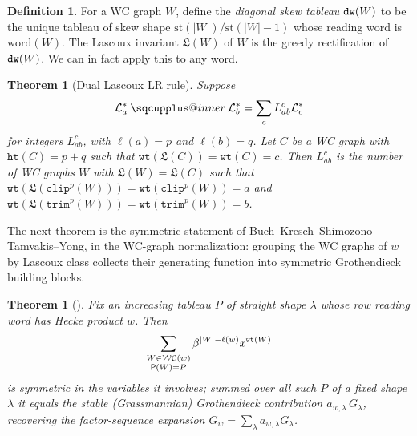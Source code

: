 \documentclass{amsart}
\makeatletter
\newcommand{\sqcupplus@inner}[2]{%
  \vcenter{\hbox{\ooalign{%
    \hfil$\m@th#1\sqcup$\hfil\cr
    \hfil\raisebox{0.15ex}{$\m@th#1\scriptscriptstyle+$}\hfil\cr
  }}}%
}
\newcommand{\sqcupplus}{\mathbin{\mathpalette\sqcupplus@inner\relax}}
\newtheorem{theorem}[lemma]{Theorem}
\theoremstyle{definition}
\newtheorem{definition}[lemma]{Definition}
\theoremstyle{remark}
\numberwithin{equation}{subsection}
\newcommand{\wtt}{\mathtt{wt}}
\newcommand{\trm}{\mathtt{trim}}
\newcommand{\hr}{\mathtt{ht}}
\newcommand{\clp}{\mathtt{clip}}
\newcommand{\WC}{\mathcal{WC}}
\makeatother
\begin{document}
\newcommand{\hi}{\mathfrak{L}}
\begin{definition}
For a WC graph $W$, define the \emph{diagonal skew tableau} $\mathtt{dw}(W)$ to be the unique tableau of skew shape $\mathrm{st}(|W|)/\mathrm{st}(|W|-1)$ whose reading word is $\mathrm{word}(W)$. The Lascoux invariant $\hi(W)$ of $W$ is the greedy rectification of $\mathtt{dw}(W)$. We can in fact apply this to any word.
\end{definition}


\begin{theorem}[Dual Lascoux LR rule]
Suppose
$$\mathcal{L}_a^*\sqcupplus \mathcal{L}_b^* = \sum_c L_{ab}^c\mathcal{L}_c^*$$
for integers $L_{ab}^c$, with $\ell(a)=p$ and $\ell(b)=q$. Let $C$ be a WC graph with $\hr(C)=p+q$ such that $\wtt(\hi(C)) = \wtt(C) = c$. Then $L_{ab}^c$ is the number of WC graphs $W$ with $\hi(W) = \hi(C)$ such that $\wtt(\hi(\clp^p(W))) = \wtt(\clp^p(W)) = a$ and $\wtt(\hi(\trm^p(W))) = \wtt(\trm^p(W)) = b$.
\end{theorem}


The next theorem is the symmetric statement of
Buch--Kresch--Shimozono--Tamvakis--Yong, in the WC-graph normalization: grouping
the WC graphs of $w$ by Lascoux class collects their generating function into
symmetric Grothendieck building blocks.

\begin{theorem}[\cite{buch2008factorsequences}]
\label{theorem:bksty}
Fix an increasing tableau $P$ of straight shape $\lambda$ whose row reading word
has Hecke product $w$. Then
$$\sum_{\substack{W\in\WC(w)\\ \Pw(W)=P}}\beta^{|W|-\ell(w)}x^{\wtt(W)}$$
is symmetric in the variables it involves; summed over all such $P$ of a fixed
shape $\lambda$ it equals the stable (Grassmannian) Grothendieck contribution
$a_{w,\lambda}\,G_\lambda$, recovering the factor-sequence expansion
$G_w=\sum_\lambda a_{w,\lambda}G_\lambda$.
\end{theorem}
\end{document}
